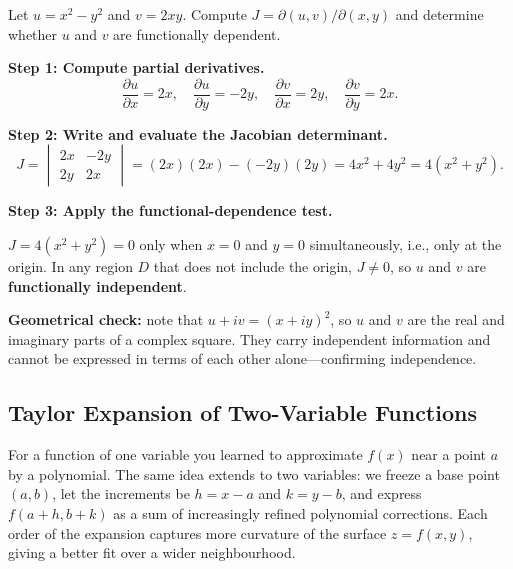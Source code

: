 \documentclass[12pt,a4paper]{article}
\begin{document}
Let \( u = x^{2} - y^{2} \) and \( v = 2xy \). Compute \( J = \partial(u,v)/\partial(x,y) \) and determine whether \( u \) and \( v \) are functionally dependent.

\textbf{Step 1: Compute partial derivatives.}
\[
  \frac{\partial u}{\partial x} = 2x, \quad
  \frac{\partial u}{\partial y} = -2y, \quad
  \frac{\partial v}{\partial x} = 2y, \quad
  \frac{\partial v}{\partial y} = 2x.
\]

\textbf{Step 2: Write and evaluate the Jacobian determinant.}
\[
  J = \begin{vmatrix} 2x & -2y \\ 2y & 2x \end{vmatrix}
    = (2x)(2x) - (-2y)(2y)
    = 4x^{2} + 4y^{2}
    = 4(x^{2} + y^{2}).
\]

\textbf{Step 3: Apply the functional-dependence test.}

\( J = 4(x^{2}+y^{2}) = 0 \) only when \( x = 0 \) and \( y = 0 \) simultaneously, i.e., only at the origin. In any region \( D \) that does not include the origin, \( J \neq 0 \), so \( u \) and \( v \) are \textbf{functionally independent}.

\textbf{Geometrical check:} note that \( u + iv = (x+iy)^{2} \), so \( u \) and \( v \) are the real and imaginary parts of a complex square. They carry independent information and cannot be expressed in terms of each other alone---confirming independence.

\subsection{Taylor Expansion of Two-Variable Functions}

For a function of one variable you learned to approximate \( f(x) \) near a point \( a \) by a polynomial. The same idea extends to two variables: we freeze a base point \( (a,b) \), let the increments be \( h = x - a \) and \( k = y - b \), and express \( f(a+h, b+k) \) as a sum of increasingly refined polynomial corrections. Each order of the expansion captures more curvature of the surface \( z = f(x,y) \), giving a better fit over a wider neighbourhood.
\end{document}
